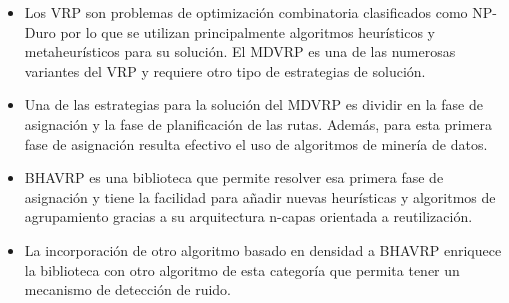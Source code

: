 \begin{itemize}
  \item Los VRP son problemas de optimización combinatoria clasificados como NP-Duro por lo que se utilizan principalmente algoritmos heurísticos y metaheurísticos para su solución. El MDVRP es una de las numerosas variantes del VRP y requiere otro tipo de estrategias de solución.
  \item Una de las estrategias para la solución del MDVRP es dividir en la fase de asignación y la fase de planificación de las rutas. Además, para esta primera fase de asignación resulta efectivo el uso de algoritmos de minería de datos.
  \item BHAVRP es una biblioteca que permite resolver esa primera fase de asignación y tiene la facilidad para a\~nadir nuevas heurísticas y algoritmos de agrupamiento gracias a su arquitectura n-capas orientada a reutilización.
  \item La incorporación de otro algoritmo basado en densidad a BHAVRP enriquece la biblioteca con otro algoritmo de esta categoría que permita tener un mecanismo de detección de ruido.
\end{itemize}